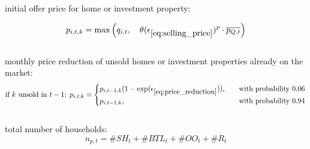 \documentclass[]{article}
\begin{document}
\begin{flushleft}
	initial offer price for home or investment property:
\end{flushleft}
\begin{equation} \label{eq:selling_price}
p_{i,t,k} = \max \left(q_{i,t} , \quad \theta(\epsilon_{\eqref{eq:selling_price}})^{p} \cdot \overline{p_{Q,t}}\right)
\end{equation}
\\
monthly price reduction of unsold homes or investment properties already on the market:
\begin{equation} \label{eq:price_reduction}
\text{if $k$ unsold in $t-1$: }	p_{i,t, k} = 
\begin{cases}
p_{i,t-1, k} (1-\exp(\epsilon_{\eqref{eq:price_reduction}})), &\quad \text{with probability 0.06} \\
p_{i,t-1, k}, &\quad \text{with probability 0.94} 
\end{cases}
\end{equation}
\\
total number of households:
\begin{equation} \label{eq:n_p}
	n_{p, t}= \#SH_{t}+\#BTL_{t}+\#OO_{t}+\#R_{t}
\end{equation}
\\
\end{document}
